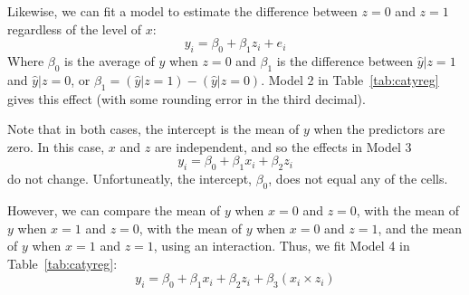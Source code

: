 Likewise, we can fit a model to estimate the difference between $z=0$ and $z=1$ regardless of the level of $x$:
\[
y_i = \beta_0+\beta_1z_i+e_i
\]
Where $\beta_0$ is the average of $y$ when $z=0$ and $\beta_1$ is the difference between $\hat{y}|z=1$ and $\hat{y}|z=0$, or $\beta_1 = \left(\hat{y}|z=1\right) - \left(\hat{y}|z=0\right)$. Model 2 in Table~\ref{tab:catyreg} gives this effect (with some rounding error in the third decimal).

Note that in both cases, the intercept is the mean of $y$ when the predictors are zero. In this case, $x$ and $z$ are independent, and so the effects in Model 3
\[
y_i=\beta_0+\beta_1x_i+\beta_2z_i
\]
do not change. Unfortuneatly, the intercept, $\beta_0$, does not equal any of the cells.

However, we can compare the mean of $y$ when $x=0$ and $z=0$, with the mean of $y$ when $x=1$ and $z=0$, with the mean of $y$ when $x=0$ and $z=1$, and the mean of $y$ when $x=1$ and $z=1$, using an interaction. Thus, we fit Model 4 in Table~\ref{tab:catyreg}:
\[
y_i=\beta_0+\beta_1x_i+\beta_2z_i+\beta_3\left(x_i\times z_i\right)
\]

